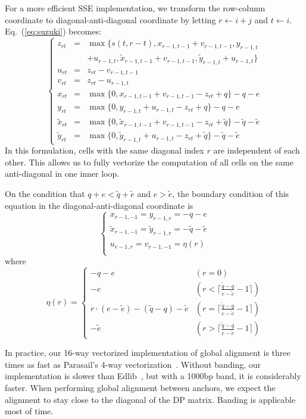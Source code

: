 \documentclass{bioinfo}
\begin{document}
\begin{methods}
For a more efficient SSE implementation, we transform the row-column coordinate
to diagonal-anti-diagonal coordinate by letting $r\gets i+j$ and $t\gets i$.
Eq.~(\ref{eq:suzuki}) becomes:
\begin{equation*}
\left\{\begin{array}{lll}
z_{rt}&=&\max\{s(t,r-t),x_{r-1,t-1}+v_{r-1,t-1},y_{r-1,t}\\
&&+u_{r-1,t},\tilde{x}_{r-1,t-1}+v_{r-1,t-1},\tilde{y}_{r-1,t}+u_{r-1,t}\}\\
u_{rt}&=&z_{rt}-v_{r-1,t-1}\\
v_{rt}&=&z_{rt}-u_{r-1,t}\\
x_{rt}&=&\max\{0,x_{r-1,t-1}+v_{r-1,t-1}-z_{rt}+q\}-q-e\\
y_{rt}&=&\max\{0,y_{r-1,t}+u_{r-1,t}-z_{rt}+q\}-q-e\\
\tilde{x}_{rt}&=&\max\{0,\tilde{x}_{r-1,t-1}+v_{r-1,t-1}-z_{rt}+\tilde{q}\}-\tilde{q}-\tilde{e}\\
\tilde{y}_{rt}&=&\max\{0,\tilde{y}_{r-1,t}+u_{r-1,t}-z_{rt}+\tilde{q}\}-\tilde{q}-\tilde{e}
\end{array}\right.
\end{equation*}
In this formulation, cells with the same diagonal index $r$ are independent of
each other. This allows us to fully vectorize the computation of all cells on
the same anti-diagonal in one inner loop.

On the condition that $q+e<\tilde{q}+\tilde{e}$ and $e>\tilde{e}$, the boundary
condition of this equation in the diagonal-anti-diagonal coordinate is
\[
\left\{\begin{array}{l}
x_{r-1,-1}=y_{r-1,r}=-q-e\\
\tilde{x}_{r-1,-1}=\tilde{y}_{r-1,r}=-\tilde{q}-\tilde{e}\\
u_{r-1,r}=v_{r-1,-1}=\eta(r)\\
\end{array}\right.
\]
where
\[
\eta(r)=\left\{\begin{array}{ll}
-q-e & (r=0) \\
-e & (r<\lceil\frac{\tilde{q}-q}{e-\tilde{e}}-1\rceil) \\
r\cdot(e-\tilde{e})-(\tilde{q}-q)-\tilde{e} & (r=\lceil\frac{\tilde{q}-q}{e-\tilde{e}}-1\rceil) \\
-\tilde{e} & (r>\lceil\frac{\tilde{q}-q}{e-\tilde{e}}-1\rceil)
\end{array}\right.
\]

In practice, our 16-way vectorized implementation of global alignment is three
times as fast as Parasail's 4-way vectorization~\citep{Daily:2016aa}.  Without
banding, our implementation is slower than Edlib~\citep{Sosic:2017aa}, but with
a 1000bp band, it is considerably faster. When performing global alignment
between anchors, we expect the alignment to stay close to the diagonal of the
DP matrix. Banding is applicable most of time.


\end{methods}
\end{document}
